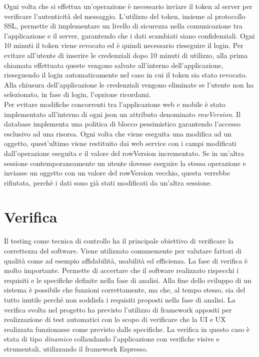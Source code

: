 \documentclass[12pt]{report}
\begin{document}
Ogni volta che si effettua un'operazione è necessario inviare il token al server per verificare l'autenticità del messaggio. L'utilizzo del token, insieme al protocollo SSL\cite{rfc6101}, permette di implementare un livello di sicurezza nella comunicazione tra l'applicazione e il server, garantendo che i dati scambiati siano confidenziali. Ogni 10 minuti il token viene revocato ed è quindi necessario rieseguire il login. Per evitare all'utente di inserire le credenziali dopo 10 minuti di utilizzo, alla prima chiamata effettuata queste vengono salvate all'interno dell'applicazione, rieseguendo il login automaticamente nel caso in cui il token sia stato revocato. Alla chiusura dell'applicazione le credenziali vengono eliminate se l'utente non ha selezionato, in fase di login, l'opzione ricordami.\\Per evitare modifiche concorrenti tra l'applicazione web e mobile è stato implementato all'interno di ogni json un attributo denominato \textit{rowVersion}. Il database implementa una politica di blocco pessimistico garantendo l'accesso esclusivo ad una risorsa. Ogni volta che viene eseguita una modifica ad un oggetto, quest'ultimo viene restituito dai web service con i campi modificati dall'operazione eseguita e il valore del rowVersion incrementato. Se in un'altra sessione contemporaneamente un utente dovesse eseguire la stessa operazione e inviasse un oggetto con un valore del rowVersion vecchio, questa verrebbe rifiutata, perchè i dati sono già stati modificati da un'altra sessione.




\chapter{Verifica}
Il testing come tecnica di controllo ha il principale obiettivo di verificare la correttezza del software. Viene utilizzato comunemente per valutare fattori di qualità come ad esempio affidabilità, usabilità ed efficienza. La fase di verifica è molto importante. Permette di accertare che il software realizzato rispecchi i requisiti e le specifiche definite nella fase di analisi. Alla fine dello sviluppo di un sistema è possibile che funzioni correttamente, ma che, al tempo stesso, sia del tutto inutile perchè non soddisfa i requisiti proposti nella fase di analisi. La verifica svolta nel progetto ha previsto l'utilizzo di framework appositi per realizzazione di test automatici con lo scopo di verificare che la UI e UX realizzata funzionasse come previsto dalle specifiche. La verifica in questo caso è stata di tipo \textit{dinamico} collaudando l'applicazione con verifiche visive e strumentali, utilizzando il framework Espresso.
\end{document}
